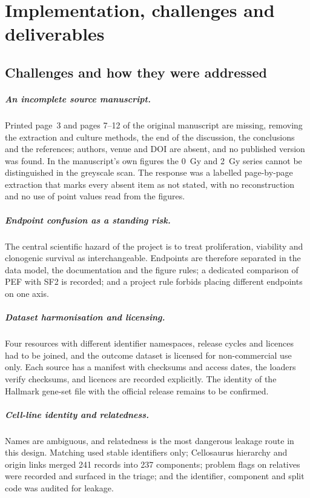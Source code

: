 \chapter{Implementation, challenges and deliverables}\label{ch:implementation}

\section{Challenges and how they were addressed}

\paragraph{An incomplete source manuscript.} Printed page~3 and pages 7--12 of the original
manuscript are missing, removing the extraction and culture methods, the end of the
discussion, the conclusions and the references; authors, venue and DOI are absent, and no
published version was found. In the manuscript's own figures the 0~Gy and 2~Gy series cannot
be distinguished in the greyscale scan. The response was a labelled page-by-page extraction
that marks every absent item as not stated, with no reconstruction and no use of point values
read from the figures.

\paragraph{Endpoint confusion as a standing risk.} The central scientific hazard of the
project is to treat proliferation, viability and clonogenic survival as interchangeable.
Endpoints are therefore separated in the data model, the documentation and the figure rules;
a dedicated comparison of PEF with SF2 is recorded; and a project rule forbids placing
different endpoints on one axis.

\paragraph{Dataset harmonisation and licensing.} Four resources with different identifier
namespaces, release cycles and licences had to be joined, and the outcome dataset is licensed
for non-commercial use only. Each source has a manifest with checksums and access dates, the
loaders verify checksums, and licences are recorded explicitly. The identity of the Hallmark
gene-set file with the official release remains to be confirmed.

\paragraph{Cell-line identity and relatedness.} Names are ambiguous, and relatedness is the
most dangerous leakage route in this design. Matching used stable identifiers only;
Cellosaurus hierarchy and origin links merged 241 records into 237 components; problem flags
on relatives were recorded and surfaced in the triage; and the identifier, component and
split code was audited for leakage.

